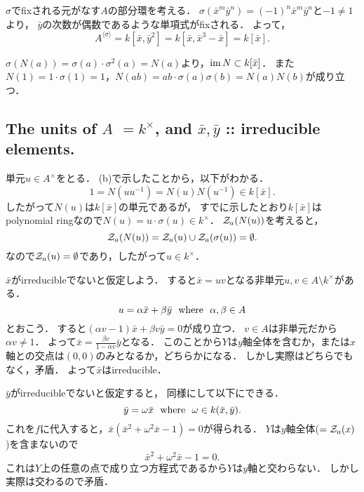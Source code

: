 \documentclass[a4paper]{jsarticle}
\begin{document}
    $\sigma$でfixされる元がなす$A$の部分環を考える．
    $\sigma(\bar{x}^m \bar{y}^n)=(-1)^n \bar{x}^m \bar{y}^n$と$-1 \neq 1$より，
    $\bar{y}$の次数が偶数であるような単項式がfixされる．
    よって，
    \[ A^{\langle \sigma \rangle}=k[\bar{x}, \bar{y}^2]=k[\bar{x}, \bar{x}^3-\bar{x}]=k[\bar{x}]. \]

    $\sigma(N(a))=\sigma(a) \cdot \sigma^2(a)=N(a)$より，$\operatorname{im} N \subset k[\bar{x}]$．
    また$N(1)=1 \cdot \sigma(1)=1$，$N(ab)=ab \cdot \sigma(a) \sigma(b)=N(a)N(b)$が成り立つ．

    \subsection{The units of $A$ $=k^{\times}$, and $\bar{x}, \bar{y}$ :: irreducible elements.}
    単元$u \in A^{\times}$をとる．
    (b)で示したことから，以下がわかる．
    \[ 1=N(u u^{-1})=N(u) N(u^{-1}) \in k[\bar{x}]. \]
    したがって$N(u)$は$k[\bar{x}]$の単元であるが，
    すでに示したとおり$k[\bar{x}]$はpolynomial ringなので$N(u)=u \cdot \sigma(u) \in k^{\times}$．
    $\mathcal{Z}_a(N(u))$を考えると，
    \[ \mathcal{Z}_a(N(u))=\mathcal{Z}_a(u) \cup \mathcal{Z}_a(\sigma(u))=\emptyset. \]
    なので$\mathcal{Z}_a(u)=\emptyset$であり，したがって$u \in k^{\times}$．

    $\bar{x}$がirreducibleでないと仮定しよう．
    すると$\bar{x}=u v$となる非単元$u,v \in A \setminus k^{\times}$がある．
    \[ u=\alpha \bar{x}+\beta \bar{y} \text{~~where~~} \alpha,\beta \in A \]
    とおこう．
    すると$(\alpha v-1) \bar{x}+\beta v \bar{y}=0$が成り立つ．
    $v \in A$は非単元だから$\alpha v \neq 1$．
    よって$\bar{x}=\frac{\beta v}{1- \alpha v} \bar{y}$となる．
    このことから$Y$は$y$軸全体を含むか，または$x$軸との交点は$(0,0)$のみとなるか，どちらかになる．
    しかし実際はどちらでもなく，矛盾．
    よって$\bar{x}$はirreducible．

    $\bar{y}$がirreducibleでないと仮定すると，
    同様にして以下にできる．
    \[ \bar{y}=\omega \bar{x} \text{~~where~~} \omega \in k(\bar{x}, \bar{y}). \]
    これを$f$に代入すると，$\bar{x}(\bar{x}^2+\omega^2 \bar{x}-1)=0$が得られる．
    $Y$は$y$軸全体($=\mathcal{Z}_a(x)$)を含まないので
    \[ \bar{x}^2+\omega^2 \bar{x}-1=0. \]
    これは$Y$上の任意の点で成り立つ方程式であるから$Y$は$y$軸と交わらない．
    しかし実際は交わるので矛盾．

\end{document}
